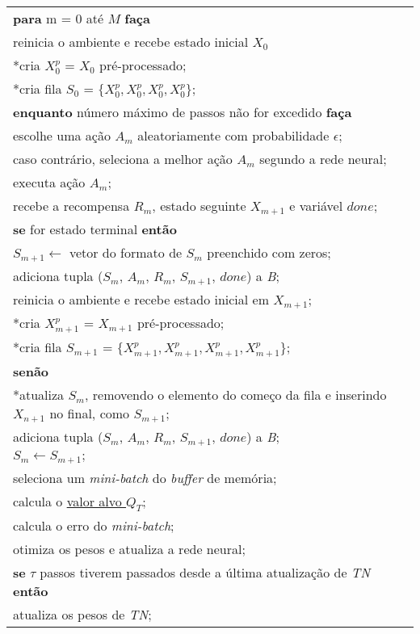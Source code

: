 \begin{tabular}{l}
\textbf{para} m = 0 até $M$ \textbf{faça}\\
\qquad reinicia o ambiente e recebe estado inicial $X_{0}$\\
*\qquad cria $X^{p}_{0}$ = $X_{0}$ pré-processado;\\
*\qquad cria fila $S_{0}$ = $\{X^{p}_{0}, X^{p}_{0}, X^{p}_{0}, X^{p}_{0}\}$;\\
\qquad \textbf{enquanto} número máximo de passos não for excedido \textbf{faça}\\
\qquad \qquad escolhe uma ação $A_{m}$ aleatoriamente com probabilidade $\epsilon$;\\
\qquad \qquad caso contrário, seleciona a melhor ação $A_{m}$ segundo a rede neural;\\
\qquad \qquad executa ação $A_{m}$;\\
\qquad \qquad recebe a recompensa $R_{m}$, estado seguinte $X_{m+1}$ e variável $done$;\\
\qquad \qquad \textbf{se} for estado terminal \textbf{então}\\
\qquad \qquad \qquad $S_{m+1} \leftarrow$ vetor do formato de $S_{m}$ preenchido com zeros;\\
\qquad \qquad \qquad adiciona tupla ($S_{m}$, $A_{m}$, $R_{m}$, $S_{m+1}$, $done$) a \textit{B};\\
\qquad \qquad \qquad reinicia o ambiente e recebe estado inicial em $X_{m+1}$;\\
*\qquad \qquad \qquad cria $X^{p}_{m+1}$ = $X_{m+1}$ pré-processado;\\
*\qquad \qquad \qquad cria fila $S_{m+1}$ = $\{X^{p}_{m+1}, X^{p}_{m+1}, X^{p}_{m+1}, X^{p}_{m+1}\}$;\\
\qquad \qquad \textbf{senão}\\
*\qquad \qquad \qquad atualiza $S_{m}$, removendo o elemento do começo da fila e inserindo $X_{n+1}$ no final, como $S_{m+1}$;\\
\qquad \qquad \qquad adiciona tupla ($S_{m}$, $A_{m}$, $R_{m}$, $S_{m+1}$, $done$) a \textit{B};\\
\qquad \qquad \qquad $S_{m} \leftarrow S_{m+1};$ \\

\qquad \qquad seleciona um \textit{mini-batch} do \textit{buffer} de memória;\\
\qquad \qquad calcula o \hyperref[eq:q_target]{valor alvo $Q_{T}$};\\
\qquad \qquad calcula o erro do \textit{mini-batch};\\
\qquad \qquad otimiza os pesos e atualiza a rede neural;\\
\qquad \qquad \textbf{se} $\tau$ passos tiverem passados desde a última atualização de \textit{TN} \textbf{então}\\
\qquad \qquad \qquad atualiza os pesos de \textit{TN};\\

\hline
\end{tabular}

